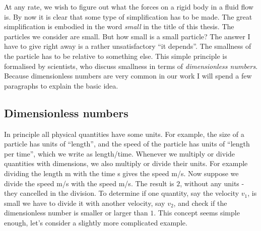 \documentclass[thesis.tex]{subfiles}
\begin{document}
At any rate, we wish to figure out what the forces on a rigid body in a fluid flow is. By now it is clear that some type of simplification has to be made. The great simplification is embodied in the word \emph{small} in the title of this thesis. The particles we consider are small. But how small is a small particle? The answer I have to give right away is a rather unsatisfactory ``it depends''. The smallness of the particle has to be relative to something else. This simple principle is formalised by scientists, who discuss smallness in terms of \emph{dimensionless numbers}. Because dimensionless numbers are very common in our work I will spend a few paragraphs to explain the basic idea.

\subsection*{Dimensionless numbers}

In principle all physical quantities have some units. For example, the size of a particle has units of ``length'', and the speed of the particle has units of ``length per time'', which we write as length/time. Whenever we multiply or divide quantities with dimensions, we also multiply or divide their units. For example dividing the length \unit[20]{m} with the time \unit[5]{s} gives the speed \unit[4]{m/s}. Now suppose we divide the speed \unit[4]{m/s} with the speed \unit[2]{m/s}. The result is $2$, without any units - they cancelled in the division. To determine if one quantity, say the velocity $v_1$, is small we have to divide it with another velocity, say $v_2$, and check if the dimensionless number is smaller or larger than $1$. This concept seems simple enough, let's consider a slightly more complicated example.
\end{document}
